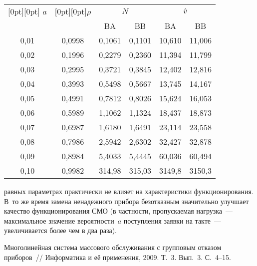 \begin{multicols}{2}
\begin{table*}
\begin{center}
\begin{tabular}{|c|c|r|r|r|r|}
\hline
\raisebox{-6pt}[0pt][0pt]{ $a$} &  \raisebox{-6pt}[0pt][0pt]{$\rho$}
& \multicolumn{2}{c|}{ $N$} &\multicolumn{2}{c|}{ $\hat v$} \\
\cline{3-6}
& & \multicolumn{1}{c|}{BA} & \multicolumn{1}{c|}{BB} & \multicolumn{1}{c|}{BA} & \multicolumn{1}{c|}{BB} \\
\hline
 0,01 & 0,0998 & 0,1061 & 0,1101 & 10,610 & 11,006 \\
 0,02 & 0,1996 & 0,2279 & 0,2360 & 11,394 & 11,799 \\
 0,03 & 0,2995 & 0,3721 & 0,3845 & 12,402 & 12,816 \\
 0,04 & 0,3993 & 0,5498 & 0,5667 & 13,745 & 14,167 \\
 0,05 & 0,4991 & 0,7812 & 0,8026 & 15,624 & 16,053 \\
 0,06 & 0,5989 & 1,1062 & 1,1324 & 18,437 & 18,873 \\
 0,07 & 0,6987 & 1,6180 & 1,6491 & 23,114 & 23,558 \\
 0,08 & 0,7986 & 2,5942 & 2,6302 & 32,427 & 32,878 \\
 0,09 & 0,8984 & 5,4033 & 5,4445 & 60,036 & 60,494 \\
 0,10 & 0,9982 & 314,98\hphantom{99} & 315,03\hphantom{99} & 3149,8\hphantom{99} & 3150,3\hphantom{99} \\
\hline
\end{tabular}
\end{center}
\end{table*}


\noindent
 равных параметрах
практически не влияет на характеристики функционирования.
В~то же время замена ненадежного прибора безотказным
значительно улучшает качество функционирования СМО
(в частности, пропускаемая нагрузка~--- максимальное
значение вероятности~$a$ поступления заявки на такте~---
увеличивается более чем в два раза).

\vspace*{-6pt}

{\small\frenchspacing
{%
\begin{thebibliography}{99}

\vspace*{-3pt}

 Многолинейная
система массового обслуживания с групповым отказом приборов~//
Информатика и её применения, 2009. Т.~3. Вып.~3. С.~4--15.



\end{thebibliography}}}
\end{multicols}

